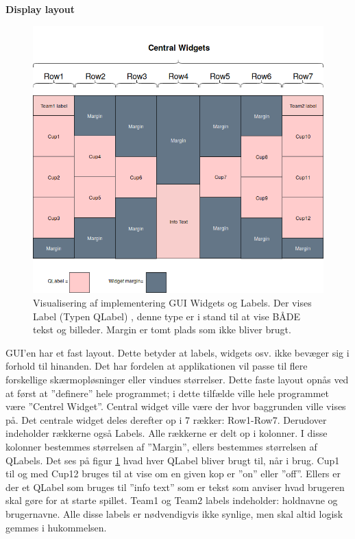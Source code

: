 \documentclass[Softwaredesign/Softwaredesign_main.tex]{subfiles}
\begin{document}
\textbf{Display layout}
\begin{figure}
    \centering
    \includegraphics[scale=0.5]{Softwaredesign/GUI/Pictures/Boards_design.png}
    \caption{Visualisering af implementering GUI Widgets og Labels. Der vises Label (Typen QLabel) , denne type er i stand til at vise BÅDE tekst og billeder. Margin er tomt plads som ikke bliver brugt.    }
    \label{gui_design_implementering}
\end{figure}

GUI'en har et fast layout. Dette betyder at labels, widgets osv. ikke bevæger sig i forhold til hinanden. Det har fordelen at applikationen vil passe til flere forskellige skærmopløsninger eller vindues størrelser. Dette faste layout opnås ved at først at ''definere'' hele programmet; i dette tilfælde ville hele programmet være ''Centrel Widget''. Central widget ville være der hvor baggrunden ville vises på. Det centrale widget deles derefter op i 7 rækker: Row1-Row7. Derudover indeholder rækkerne også Labels. Alle rækkerne er delt op i kolonner. I disse kolonner bestemmes størrelsen af ''Margin'', ellers bestemmes størrelsen af QLabels. Det ses på figur \ref{gui_design_implementering} hvad hver QLabel bliver brugt til, når i brug. Cup1 til og med Cup12 bruges til at vise om en given kop er ''on'' eller ''off''. Ellers er der et QLabel som bruges til ''info text'' som er tekst som anviser hvad brugeren skal gøre for at starte spillet. Team1 og Team2 labels indeholder: holdnavne og brugernavne. Alle disse labels er nødvendigvis ikke synlige, men skal altid logisk gemmes i hukommelsen.
\end{document}
